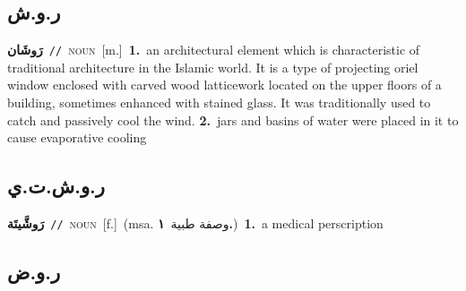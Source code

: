 \documentclass[10pt,a4paper,twoside]{article} %
\begin{document}
\begin{multicols}{2}
\vspace{-3mm}
\subsection*{\color{blue}\foreignlanguage{arabic}{ر.و.ش}\color{blue}{ (ntws)}} 

{\setlength\topsep{0pt}\textbf{\foreignlanguage{arabic}{رَوشَان}}\ {\color{gray}\texttt{//}\color{black}}\ \textsc{noun}\ [m.]\ \textbf{1.}~an architectural element which is characteristic of traditional architecture in the Islamic world. It is a type of projecting oriel window enclosed with carved wood latticework located on the upper floors of a building, sometimes enhanced with stained glass. It was traditionally used to catch and passively cool the wind.  \textbf{2.}~jars and basins of water were placed in it to cause evaporative cooling\ } \vspace{2mm}

\vspace{-3mm}
\subsection*{\color{blue}\foreignlanguage{arabic}{ر.و.ش.ت.ي}\color{blue}{ (ntws)}} 

{\setlength\topsep{0pt}\textbf{\foreignlanguage{arabic}{رَوشَّيتَة}}\ {\color{gray}\texttt{//}\color{black}}\ \textsc{noun}\ [f.]\ \color{gray}(msa. \foreignlanguage{arabic}{وصفة طبية}~\foreignlanguage{arabic}{\textbf{١.}})\color{black}\ \textbf{1.}~a medical perscription\ } \vspace{2mm}

\vspace{-3mm}
\subsection*{\color{blue}\foreignlanguage{arabic}{ر.و.ض}\color{blue}{}} 


\end{multicols}
\end{document}

